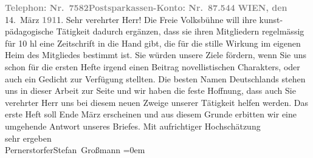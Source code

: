 \begin{ledgroupsized}[t]{13cm}
           \pstart
           \textcolor{gray}{\textbf{Telephon: Nr. 7582}}\hfill \textcolor{gray}{\textbf{Postsparkassen-Konto: Nr. 87.544}}\pend
           \pstart
           \raggedleft{}\textcolor{gray}{\textbf{WIEN, den}}{ }14. März \textcolor{gray}{\textbf{191}}1.\pend
           \pstart\center{}Sehr verehrter Herr!\pend\pstart
           Die Freie Volksbühne will ihre
                    kunst-pädagogische Tätigkeit dadurch ergänzen, dass sie ihren Mitgliedern
                    regelmässig für 10 hl eine Zeitschrift in die Hand gibt, die für die stille Wirkung im eigenen
                    Heim des Mitgliedes bestimmt ist. Sie würden unsere Ziele fördern, wenn Sie uns
                    schon für die ersten Hefte irgend einen Beitrag novellistischen Charakters, oder
                    auch ein Gedicht zur Verfügung stellten. Die besten Namen Deutschlands stehen
                    uns in dieser Arbeit zur Seite und wir haben die feste Hoffnung, dass auch Sie
                    verehrter Herr uns bei diesem neuen Zweige unserer Tätigkeit helfen werden.\pend
           \pstart
           Das erste Heft soll
                        Ende März erscheinen und aus diesem Grunde erbitten wir eine
                    umgehende Antwort unseres Briefes.\pend
           \pstart
           Mit aufrichtiger Hochschätzung{\\[\baselineskip]} sehr ergeben{\\[\baselineskip]}\spacefill\mbox{Pernerstorfer}\hspace*{1.5em}\spacefill\mbox{Stefan Großmann}\pend
           \leftskip=0em{}\endnumbering{}\end{ledgroupsized}  \newcommand{\dateiname}{L02013}\newcommand{\titel}{Engelbert Pernerstorfer und Stefan Großmann an Arthur Schnitzler, 14. 3. 1911}\newcommand{\editorInnen}{Martin Anton Müller und Gerd-Hermann Susen}
      